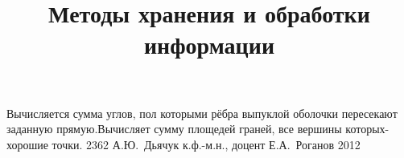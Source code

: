 \documentclass[a4paper,12pt]{memoir}
\begin{document}
\renewcommand{\contentsname}{{\Large{Оглавление}\hfill}}

\title{Методы хранения и обработки информации}
{Вычисляется сумма углов, пол которыми рёбра выпуклой оболочки пересекают заданную прямую.Вычисляет сумму площедей граней, все вершины которых-хорошие точки.}
{2362}
{А.\+Ю.~Дьячук}
{к.ф.-м.н., доцент}
{Е.\+А.~Роганов}
{2012}




\newpage

\newpage
\end{document}
